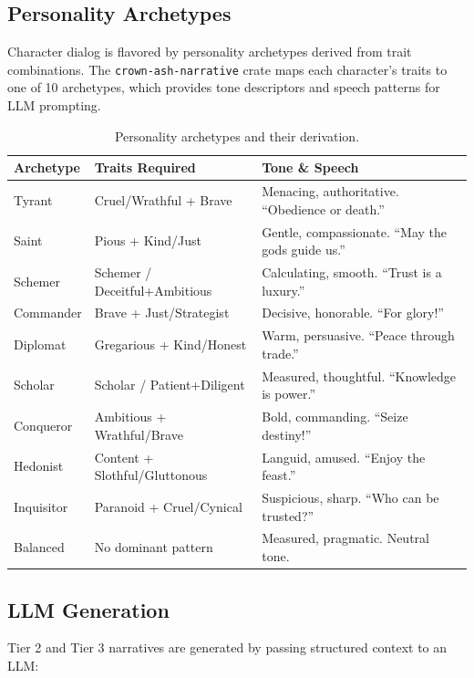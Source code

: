 \documentclass[a4paper, 11pt]{article}
\newcommand{\crateref}[1]{\texttt{crown-ash-#1}}
\begin{document}
\subsection{Personality Archetypes}
\label{sec:archetypes}

Character dialog is flavored by personality archetypes derived from trait
combinations. The \crateref{narrative} crate maps each character's traits to
one of 10 archetypes, which provides tone descriptors and speech patterns for
LLM prompting.

\begin{table}[htbp]
\centering
\caption{Personality archetypes and their derivation.}
\label{tab:archetypes}
\small
\begin{tabular}{@{}llp{5.5cm}@{}}
\toprule
\textbf{Archetype} & \textbf{Traits Required} & \textbf{Tone \& Speech} \\
\midrule
Tyrant     & Cruel/Wrathful + Brave       & Menacing, authoritative. ``Obedience or death.'' \\
Saint      & Pious + Kind/Just            & Gentle, compassionate. ``May the gods guide us.'' \\
Schemer    & Schemer / Deceitful+Ambitious & Calculating, smooth. ``Trust is a luxury.'' \\
Commander  & Brave + Just/Strategist      & Decisive, honorable. ``For glory!'' \\
Diplomat   & Gregarious + Kind/Honest     & Warm, persuasive. ``Peace through trade.'' \\
Scholar    & Scholar / Patient+Diligent   & Measured, thoughtful. ``Knowledge is power.'' \\
Conqueror  & Ambitious + Wrathful/Brave   & Bold, commanding. ``Seize destiny!'' \\
Hedonist   & Content + Slothful/Gluttonous & Languid, amused. ``Enjoy the feast.'' \\
Inquisitor & Paranoid + Cruel/Cynical     & Suspicious, sharp. ``Who can be trusted?'' \\
Balanced   & No dominant pattern           & Measured, pragmatic. Neutral tone. \\
\bottomrule
\end{tabular}
\end{table}

\subsection{LLM Generation}

Tier 2 and Tier 3 narratives are generated by passing structured context to
an LLM:
\end{document}
